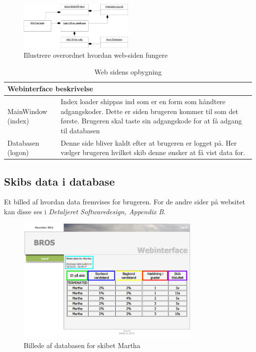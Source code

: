\begin{figure}[H]
\centering
\includegraphics[width = 0.5\textwidth]{billeder/database_web}
\caption{Illustrere overordnet hvordan web-siden fungere}
\label{fig:database_web}
\end{figure}

\begin{table}[H]
\centering
{}
\begin{tabular}{| p{3cm}  p{12cm}|}
\multicolumn{2}{l}{{\Large Webinterface beskrivelse}} \\\hline
MainWindow \phantom{m}(index) & Index loader shippas ind som er en form som håndtere adgangskoder. Dette er siden brugeren kommer til som det første. Brugeren skal taste sin adgangskode for at få adgang til databasen\\\hline
Databasen  \phantom{m}(logon) & Denne side bliver kaldt efter at brugeren er logget på. Her vælger brugeren hvilket skib denne ønsker at få vist data for.\\\hline
\end{tabular}
\caption{Web sidens opbygning}
\label{tabel:webside-simpel}
\end{table}

\subsection*{Skibs data i database}
Et billed af hvordan data fremvises for brugeren. For de andre sider på websitet kan disse ses i \textit{Detaljeret Softwaredesign, Appendix B}.
\begin{figure}[H]
	\centering
	\includegraphics[width=0.8\textwidth]{billeder/web_database_new}
	\caption{Billede af databasen for skibet Martha}
	\label{fig:web_database}
\end{figure}

